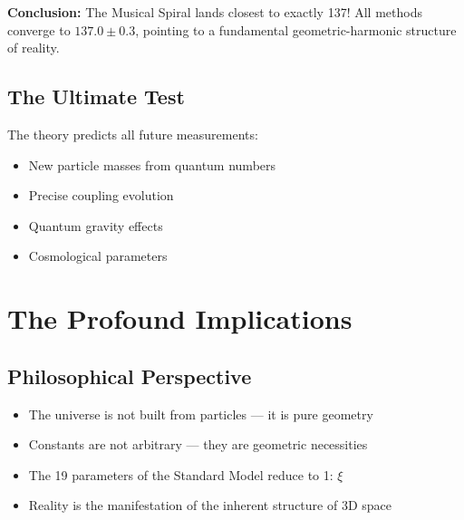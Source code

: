 	\begin{table}[h]
		\centering
		\caption{Detailed analysis of the different approaches}
	\end{table}
	
	\textbf{Conclusion:} The Musical Spiral lands closest to exactly 137! All methods converge to $137.0 \pm 0.3$, pointing to a fundamental geometric-harmonic structure of reality.
	
	\subsection{The Ultimate Test}
	
	The theory predicts all future measurements:
	\begin{itemize}
		\item New particle masses from quantum numbers
		\item Precise coupling evolution
		\item Quantum gravity effects
		\item Cosmological parameters
	\end{itemize}
	
	\section{The Profound Implications}
	
	\subsection{Philosophical Perspective}
	
	\begin{tcolorbox}[colback=orange!5!white,colframe=orange!75!black,title=The New Understanding]
		\begin{itemize}
			\item The universe is not built from particles — it is pure geometry
			\item Constants are not arbitrary — they are geometric necessities
			\item The 19 parameters of the Standard Model reduce to 1: $\xi$
			\item Reality is the manifestation of the inherent structure of 3D space
		\end{itemize}
	\end{tcolorbox}
	
